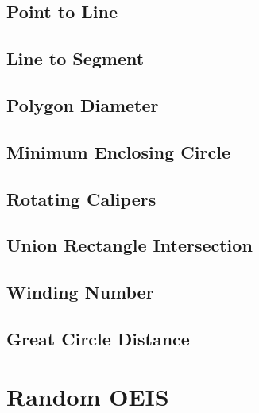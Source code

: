 \subsection{Point to Line}


\subsection{Line to Segment}


\subsection{Polygon Diameter}


\subsection{Minimum Enclosing Circle}


\subsection{Rotating Calipers}


\subsection{Union Rectangle Intersection}


\subsection{Winding Number}


\subsection{Great Circle Distance}


% 

% 

\section{Random OEIS}


